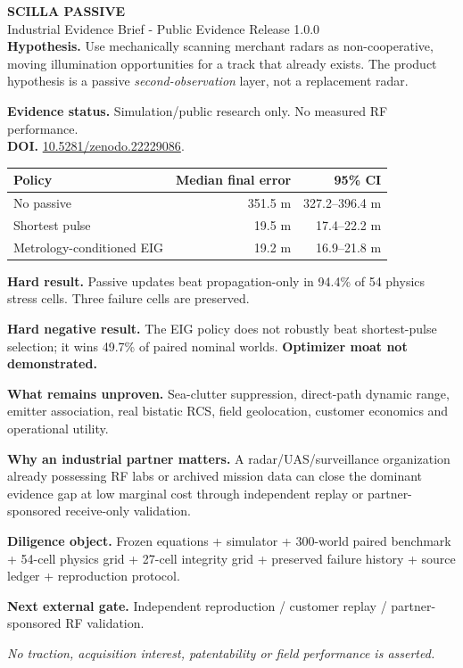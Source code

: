 \documentclass[10pt]{article}
\begin{document}
{\LARGE\textbf{SCILLA PASSIVE}}\\{\large Industrial Evidence Brief - Public Evidence Release 1.0.0}\\[4pt]
\textbf{Hypothesis.} Use mechanically scanning merchant radars as non-cooperative, moving illumination opportunities for a track that already exists. The product hypothesis is a passive \emph{second-observation} layer, not a replacement radar.

\textbf{Evidence status.} Simulation/public research only. No measured RF performance.\\\textbf{DOI.} \href{https://doi.org/10.5281/zenodo.22229086}{10.5281/zenodo.22229086}.

\begin{center}\begin{tabular}{lrr}\toprule Policy & Median final error & 95\% CI \\\midrule
No passive & 351.5 m & 327.2--396.4 m\\
Shortest pulse & 19.5 m & 17.4--22.2 m\\
Metrology-conditioned EIG & 19.2 m & 16.9--21.8 m\\\bottomrule\end{tabular}\end{center}

\textbf{Hard result.} Passive updates beat propagation-only in 94.4\% of 54 physics stress cells. Three failure cells are preserved.

\textbf{Hard negative result.} The EIG policy does not robustly beat shortest-pulse selection; it wins 49.7\% of paired nominal worlds. \textbf{Optimizer moat not demonstrated.}

\textbf{What remains unproven.} Sea-clutter suppression, direct-path dynamic range, emitter association, real bistatic RCS, field geolocation, customer economics and operational utility.

\textbf{Why an industrial partner matters.} A radar/UAS/surveillance organization already possessing RF labs or archived mission data can close the dominant evidence gap at low marginal cost through independent replay or partner-sponsored receive-only validation.

\textbf{Diligence object.} Frozen equations + simulator + 300-world paired benchmark + 54-cell physics grid + 27-cell integrity grid + preserved failure history + source ledger + reproduction protocol.

\textbf{Next external gate.} Independent reproduction / customer replay / partner-sponsored RF validation.

\textit{No traction, acquisition interest, patentability or field performance is asserted.}
\end{document}
